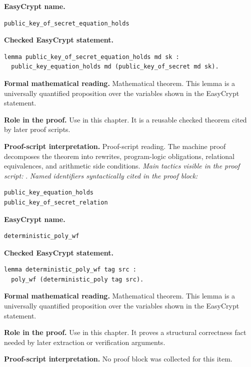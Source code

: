 \begin{formaltheorem}
\noindent\textbf{EasyCrypt name.}
\begin{lstlisting}[language=EasyCrypt,basicstyle=\ttfamily\scriptsize]
public_key_of_secret_equation_holds
\end{lstlisting}
\noindent\textbf{Checked EasyCrypt statement.}
\begin{lstlisting}[language=EasyCrypt,basicstyle=\ttfamily\scriptsize]
lemma public_key_of_secret_equation_holds md sk :
  public_key_equation_holds md (public_key_of_secret md sk).
\end{lstlisting}
\noindent\textbf{Formal mathematical reading.}
Mathematical theorem. This lemma is a universally quantified proposition over the variables shown in the EasyCrypt statement.

\noindent\textbf{Role in the proof.}
Use in this chapter. It is a reusable checked theorem cited by later proof scripts.

\noindent\textbf{Proof-script interpretation.}
Proof-script reading. The machine proof decomposes the theorem into rewrites, program-logic obligations, relational equivalences, and arithmetic side conditions.
\emph{Main tactics visible in the proof script:} .
\emph{Named identifiers syntactically cited in the proof block:}
\begin{lstlisting}[language=EasyCrypt,basicstyle=\ttfamily\scriptsize]
public_key_equation_holds
public_key_of_secret_relation
\end{lstlisting}

\end{formaltheorem}

\begin{formaltheorem}
\noindent\textbf{EasyCrypt name.}
\begin{lstlisting}[language=EasyCrypt,basicstyle=\ttfamily\scriptsize]
deterministic_poly_wf
\end{lstlisting}
\noindent\textbf{Checked EasyCrypt statement.}
\begin{lstlisting}[language=EasyCrypt,basicstyle=\ttfamily\scriptsize]
lemma deterministic_poly_wf tag src :
  poly_wf (deterministic_poly tag src).
\end{lstlisting}
\noindent\textbf{Formal mathematical reading.}
Mathematical theorem. This lemma is a universally quantified proposition over the variables shown in the EasyCrypt statement.

\noindent\textbf{Role in the proof.}
Use in this chapter. It proves a structural correctness fact needed by later extraction or verification arguments.

\noindent\textbf{Proof-script interpretation.}
No proof block was collected for this item.

\end{formaltheorem}

